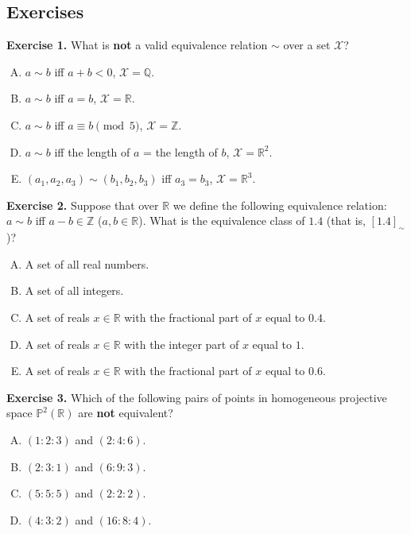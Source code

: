 \documentclass[../lecture-notes-148x210.tex]{subfiles}
\begin{document}
\newpage

\subsection{Exercises}

\textbf{Exercise 1.} What is \textbf{not} a valid equivalence relation $\sim$ over a set $\mathcal{X}$?
\begin{enumerate}[(A)]
    \item $a \sim b$ iff $a+b < 0$, $\mathcal{X} = \mathbb{Q}$.
    \item $a\sim b$ iff $a=b$, $\mathcal{X} = \mathbb{R}$.
    \item $a\sim b$ iff $a \equiv b \pmod{5}$, $\mathcal{X} = \mathbb{Z}$.
    \item $a\sim b$ iff the length of $a$ = the length of $b$, $\mathcal{X} = \mathbb{R}^2$.
    \item $(a_1,a_2,a_3)\sim (b_1,b_2,b_3)$ iff $a_3=b_3$, $\mathcal{X} = \mathbb{R}^3$.
\end{enumerate}

\textbf{Exercise 2.} Suppose that over $\mathbb{R}$ we define the following equivalence relation: $a \sim b$ iff $a-b \in \mathbb{Z}$ ($a,b \in \mathbb{R}$). What is the equivalence class of $1.4$ (that is, $[1.4]_{\sim}$)?
\begin{enumerate}[(A)]
    \item A set of all real numbers.
    \item A set of all integers.
    \item A set of reals $x \in \mathbb{R}$ with the fractional part of $x$ equal to $0.4$.
    \item A set of reals $x \in \mathbb{R}$ with the integer part of $x$ equal to $1$.
    \item A set of reals $x \in \mathbb{R}$ with the fractional part of $x$ equal to $0.6$.
\end{enumerate}

\textbf{Exercise 3.} Which of the following pairs of points in homogeneous projective space $\mathbb{P}^2(\mathbb{R})$ are \textbf{not} equivalent?
\begin{multicols}{2}
    \begin{enumerate}[(A)]
        \item $(1:2:3)$ and $(2:4:6)$.
        \item $(2:3:1)$ and $(6:9:3)$.
        \item $(5:5:5)$ and $(2:2:2)$.
        \item $(4:3:2)$ and $(16:8:4)$.
    \end{enumerate}
\end{multicols}
\end{document}
